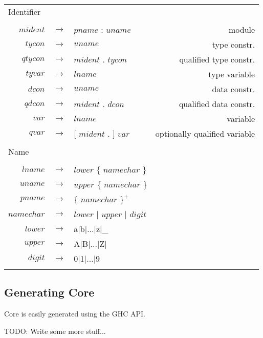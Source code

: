 \documentclass{article}
\begin{document}
\begin{footnotesize}
\begin{longtable}{ r c l r }
\multicolumn{4}{l}{Identifier}			 \\
\\[0.01in]
$mident$	& $ \rightarrow $	& $pname$ : $uname$									& module		\\
$tycon$		& $ \rightarrow $	& $uname$										& type constr.		\\
$qtycon$	& $ \rightarrow $	& $mident$ . $tycon$									& qualified type constr.\\
$tyvar$		& $ \rightarrow $	& $lname$										& type variable		\\
$dcon$		& $ \rightarrow $	& $uname$										& data constr.		\\
$qdcon$		& $ \rightarrow $	& $mident$ . $dcon$									& qualified data constr.\\
$var$		& $ \rightarrow $	& $lname$										& variable		\\
$qvar$		& $ \rightarrow $	& $[$ $mident$ . $]$ $var$								& optionally qualified variable\\
\\[0.01in]

\multicolumn{4}{l}{Name}			 \\
\\[0.01in]
$lname$		& $ \rightarrow $	& $lower$ $\{$ $namechar$ $\}$								& \\
$uname$		& $ \rightarrow $	& $upper$ $\{$ $namechar$ $\}$								& \\
$pname$		& $ \rightarrow $	& $\{$ $namechar$ $\}^{+}$								& \\
$namechar$	& $ \rightarrow $	& $lower$ $|$ $upper$ $|$ $digit$							& \\
$lower$		& $ \rightarrow $	& a$|$b$|$...$|$z$|$\_									& \\
$upper$		& $ \rightarrow $	& A$|$B$|$...$|$Z$|$									& \\
$digit$		& $ \rightarrow $	& 0$|$1$|$...$|$9									& \\
\\[0.01in]

\end{longtable}
\end{footnotesize}


\subsection{Generating Core}

Core is easily generated using the GHC API.

TODO: Write some more stuff...
\end{document}
